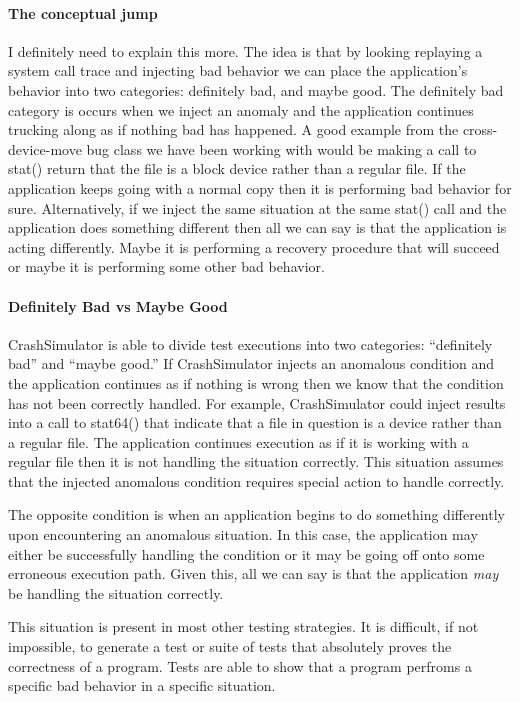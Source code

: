 \paragraph{The conceptual jump}

I definitely need to explain this more.  The idea is that by looking replaying a system call trace and injecting bad
behavior we can place the application's behavior into two categories: definitely bad, and maybe good.  The definitely
bad category is occurs when we inject an anomaly and the application continues trucking along as if nothing bad has
happened.  A good example from the cross-device-move bug class we have been working with would be making a call to
stat() return that the file is a block device rather than a regular file. If the application keeps going with a normal
copy then it is performing bad behavior for sure. Alternatively, if we inject the same situation at the same stat()
call and the application does something different then all we can say is that the application is acting
differently. Maybe it is performing a recovery procedure that will succeed or maybe it is performing some other bad
behavior.

\paragraph{Definitely Bad vs Maybe Good}

CrashSimulator is able to divide test executions into two categories: ``definitely bad'' and ``maybe good.''  If
CrashSimulator injects an anomalous condition and the application continues as if nothing is wrong then we know that the
condition has not been correctly handled.  For example, CrashSimulator could inject results into a call to stat64() that
indicate that a file in question is a device rather than a regular file.  The application continues execution as if
it is working with a regular file then it is not handling the situation correctly. This situation assumes that the
injected anomalous condition requires special action to handle correctly.

The opposite condition is when an application begins to do something differently upon encountering an anomalous
situation.  In this case, the application may either be successfully handling the condition or it may be going off onto
some erroneous execution path.  Given this, all we can say is that the application \emph{may} be handling the situation
correctly.

This situation is present in most other testing strategies. It is difficult, if not impossible, to generate a test or
suite of tests that absolutely proves the correctness of a program. Tests are able to show that a program perfroms a
specific bad behavior in a specific situation. 